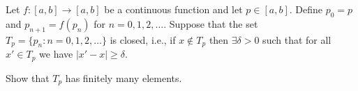 Let \(f \colon  [a, b] \to [a, b]\) be a continuous function and let \(p \in [a, b]\). Define \(p_0 = p\) and \(p_{n+1} = f(p_n)\) for \(n = 0, 1, 2,\dots\). Suppose that the set \(T_p = \{p_n : n = 0, 1, 2,\dots\}\) is closed, i.e., if \(x \not\in T_p\) then \(\exists \delta > 0\) such that for all \(x' \in T_p\) we have \(|x'-x|\ge\delta\).

Show that \(T_p\) has finitely many elements.